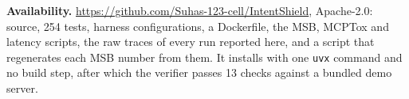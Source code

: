 \documentclass[10pt,conference]{IEEEtran}
\newcommand{\repo}{\url{https://github.com/Suhas-123-cell/IntentShield}}
\begin{document}
\textbf{Availability.} \repo, Apache-2.0: source, 254 tests, harness configurations, a Dockerfile,
the MSB, MCPTox and latency scripts, the raw traces of every run reported here, and a script that
regenerates each MSB number from them. It installs with one
\texttt{uvx} command and no build step, after which the verifier passes 13 checks against a bundled
demo server.



\end{document}
